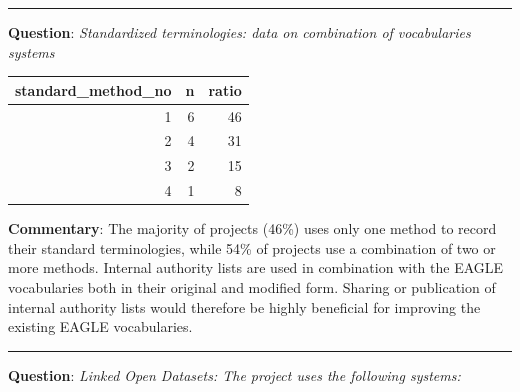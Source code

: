 \documentclass[
  12pt,
]{scrreprt}
\begin{document}
\begin{center}\rule{0.5\linewidth}{0.5pt}\end{center}

\textbf{Question}: \emph{Standardized terminologies: data on combination
of vocabularies systems}

\footnotesize

\begin{longtable}[]{@{}rrr@{}}
\toprule
standard\_method\_no & n & ratio \\
\midrule
\endhead
1 & 6 & 46 \\
2 & 4 & 31 \\
3 & 2 & 15 \\
4 & 1 & 8 \\
\bottomrule
\end{longtable}

\normalsize

\textbf{Commentary}: The majority of projects (46\%) uses only one
method to record their standard terminologies, while 54\% of projects
use a combination of two or more methods. Internal authority lists are
used in combination with the EAGLE vocabularies both in their original
and modified form. Sharing or publication of internal authority lists
would therefore be highly beneficial for improving the existing EAGLE
vocabularies.

\begin{center}\rule{0.5\linewidth}{0.5pt}\end{center}

\textbf{Question}: \emph{Linked Open Datasets: The project uses the
following systems:}

\footnotesize
\end{document}
